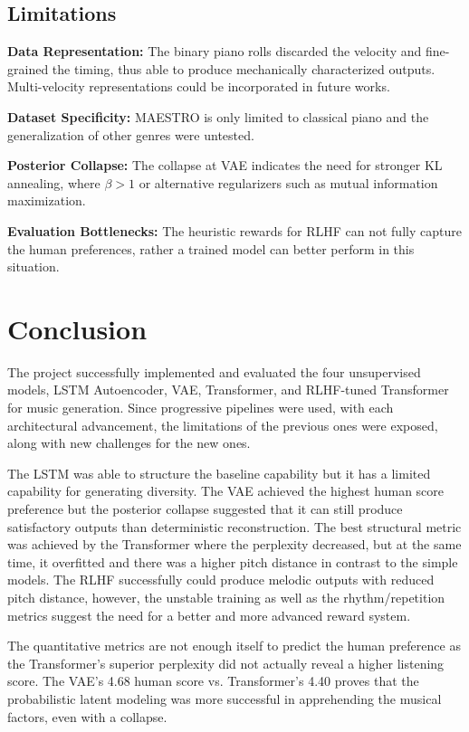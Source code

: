 \documentclass[conference]{IEEEtran}
\begin{document}
\subsection{Limitations}

\textbf{Data Representation:} The binary piano rolls discarded the velocity and fine-grained the timing, thus able to produce mechanically characterized outputs. Multi-velocity representations could be incorporated in future works.

\textbf{Dataset Specificity:} MAESTRO is only limited to classical piano and the generalization of other genres were untested.

\textbf{Posterior Collapse:} The collapse at VAE indicates the need for stronger KL annealing, where $\beta > 1$ or alternative regularizers such as mutual information maximization.

\textbf{Evaluation Bottlenecks:} The heuristic rewards for RLHF can not fully capture the human preferences, rather a trained model can better perform in this situation.

\section{Conclusion}

The project successfully implemented and evaluated the four unsupervised models, LSTM Autoencoder, VAE, Transformer, and RLHF-tuned Transformer for music generation. Since progressive pipelines were used, with each architectural advancement, the limitations of the previous ones were exposed, along with new challenges for the new ones.

The LSTM was able to structure the baseline capability but it has a limited capability for generating diversity. The VAE achieved the highest human score preference but the posterior collapse suggested that it can still produce satisfactory outputs than deterministic reconstruction. The best structural metric was achieved by the Transformer where the perplexity decreased, but at the same time, it overfitted and there was a higher pitch distance in contrast to the simple models. The RLHF successfully could produce melodic outputs with reduced pitch distance, however, the unstable training as well as the rhythm/repetition metrics suggest the need for a better and more advanced reward system.

The quantitative metrics are not enough itself to predict the human preference as the Transformer's superior perplexity did not actually reveal a higher listening score. The VAE's 4.68 human score vs. Transformer's 4.40 proves that the probabilistic latent modeling was more successful in apprehending the musical factors, even with a collapse.
\end{document}
